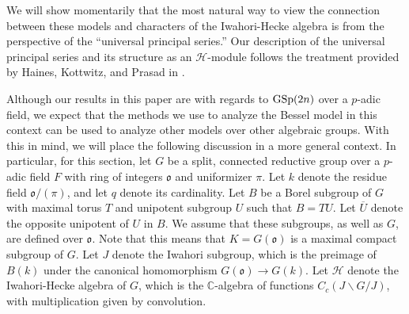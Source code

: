 \documentclass[11pt,letterpaper]{article}
\newcommand{\C}{\mathbb{C}}
\newcommand{\calH}{\mathcal{H}} %
\newcommand{\bs}{\backslash}
\newcommand{\goth}{\mathfrak}
\newcommand{\GSp}{\textup{GSp}}
\theoremstyle{remark}
\numberwithin{equation}{section}
\begin{document}
We will show momentarily that the most natural way to view the connection between these models and characters of the Iwahori-Hecke algebra is from the perspective of the ``universal principal series.'' Our description of the universal principal series and its structure as an $\calH$-module follows the treatment provided by Haines, Kottwitz, and Prasad in \cite{HKP}.

Although our results in this paper are with regards to $\GSp(2n)$ over a $p$-adic field, we expect that the methods we use to analyze the Bessel model in this context can be used to analyze other models over other algebraic groups. With this in mind, we will place the following discussion in a more general context. In particular, for this section, let $G$ be a split, connected reductive group over a $p$-adic field $F$ with ring of integers $\goth{o}$ and uniformizer $\pi$. Let $k$ denote the residue field $\goth{o}/(\pi)$, and let $q$ denote its cardinality. Let $B$ be a Borel subgroup of $G$ with maximal torus $T$ and unipotent subgroup $U$ such that $B = TU$. Let $\overline{U}$ denote the opposite unipotent of $U$ in $B$. We assume that these subgroups, as well as $G$, are defined over $\goth{o}$. Note that this means that $K = G(\goth{o})$ is a maximal compact subgroup of $G$. Let $J$ denote the Iwahori subgroup, which is the preimage of $B(k)$ under the canonical homomorphism $G(\goth{o})\to G(k)$. Let $\calH$ denote the Iwahori-Hecke algebra of $G$, which is the $\C$-algebra of functions $C_c(J\bs G/J)$, with multiplication given by convolution.

\end{document}
